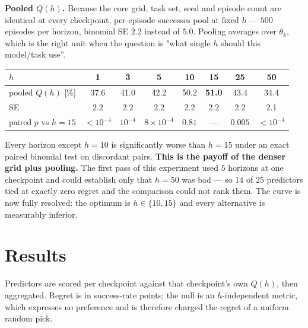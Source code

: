 \documentclass[11pt]{article}
\begin{document}
\textbf{Pooled $Q(h)$.} Because the core grid, task set, seed and episode count are identical at
every checkpoint, per-episode successes pool at fixed $h$ --- $500$ episodes per horizon, binomial
SE $2.2$ instead of $5.0$. Pooling averages over $\theta_k$, which is the right unit when the
question is "what single $h$ should this model/task use''.

\begin{center}
\begin{tabular}{lccccccc}
\toprule
$h$ & 1 & 3 & 5 & 10 & \textbf{15} & 25 & 50\\
\midrule
pooled $Q(h)$ [\%]  & 37.6 & 41.0 & 42.2 & 50.2 & \textbf{51.0} & 43.4 & 34.4\\
SE                  & 2.2 & 2.2 & 2.2 & 2.2 & 2.2 & 2.2 & 2.1\\
paired $p$ vs $h{=}15$ & $<10^{-4}$ & $10^{-4}$ & $8\!\times\!10^{-4}$ & $0.81$ & --- & $0.005$ & $<10^{-4}$\\
\bottomrule
\end{tabular}
\end{center}

Every horizon except $h=10$ is significantly worse than $h=15$ under an exact paired binomial test on
discordant pairs. \textbf{This is the payoff of the denser grid plus pooling.} The first pass of this
experiment used $5$ horizons at one checkpoint and could establish only that $h=50$ was bad --- so
$14$ of $25$ predictors tied at exactly zero regret and the comparison could not rank them. The
curve is now fully resolved: the optimum is $h\in\{10,15\}$ and every alternative is measurably
inferior.

\section{Results}

Predictors are scored per checkpoint against that checkpoint's own $Q(h)$, then aggregated. Regret is
in success-rate points; the null is an $h$-independent metric, which expresses no preference and is
therefore charged the regret of a uniform random pick.
\end{document}
